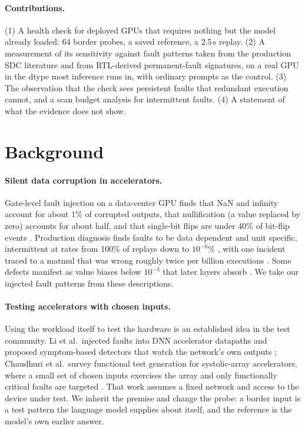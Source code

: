 \documentclass[11pt]{article}
\begin{document}
\paragraph{Contributions.}
(1) A health check for deployed GPUs that requires nothing but the model already loaded: 64 border probes, a saved reference, a 2.5\,s replay. (2) A measurement of its sensitivity against fault patterns taken from the production SDC literature and from RTL-derived permanent-fault signatures, on a real GPU in the dtype most inference runs in, with ordinary prompts as the control. (3) The observation that the check sees persistent faults that redundant execution cannot, and a scan budget analysis for intermittent faults. (4) A statement of what the evidence does not show.

\section{Background}

\paragraph{Silent data corruption in accelerators.}
Gate-level fault injection on a data-center GPU finds that NaN and infinity account for about 1\% of corrupted outputs, that nullification (a value replaced by zero) accounts for about half, and that single-bit flips are under 40\% of bit-flip events \citep{tung2026anatomy}. Production diagnosis finds faults to be data dependent and unit specific, intermittent at rates from 100\% of replays down to $10^{-6}$\% \citep{zheng2026sdcwild}, with one incident traced to a matmul that was wrong roughly twice per billion executions \citep{lei2026aegis}. Some defects manifest as value biases below $10^{-3}$ that later layers absorb \citep{zheng2026sdcwild}. We take our injected fault patterns from these descriptions.

\paragraph{Testing accelerators with chosen inputs.}
Using the workload itself to test the hardware is an established idea in the test community. Li et al.\ injected faults into DNN accelerator datapaths and proposed symptom-based detectors that watch the network's own outputs \citep{li2017errorprop}; Chaudhuri et al.\ survey functional test generation for systolic-array accelerators, where a small set of chosen inputs exercises the array and only functionally critical faults are targeted \citep{chaudhuri2023testing}. That work assumes a fixed network and access to the device under test. We inherit the premise and change the probe: a border input is a test pattern the language model supplies about itself, and the reference is the model's own earlier answer.
\end{document}
